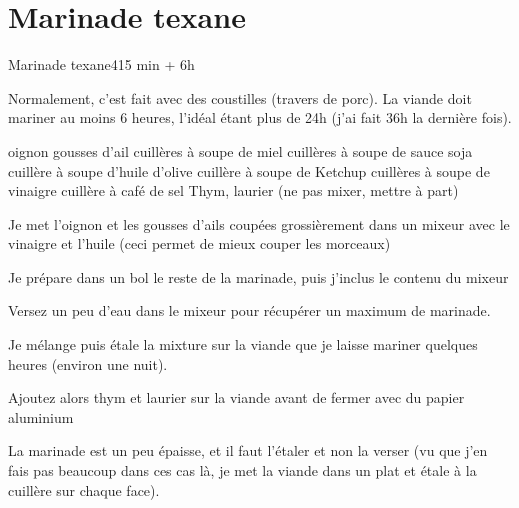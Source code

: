 {\section{Marinade texane}\label{sec:travers_texane}
\begin{recette}{Marinade texane}{4}{15 min + 6h}{}
\begin{remarque}
Normalement, c'est fait avec des coustilles (travers de porc). La viande doit mariner au moins 6 heures, l'idéal étant plus de 24h (j'ai fait 36h la dernière fois).
\end{remarque}
\begin{ingredients}
 oignon
 gousses d'ail
 cuillères à soupe de miel
 cuillères à soupe de sauce soja
 cuillère à soupe d'huile d'olive
 cuillère à soupe de Ketchup
 cuillères à soupe de vinaigre
 cuillère à café de sel
\ingredient Thym, laurier (ne pas mixer, mettre à part)
\end{ingredients}

\begin{preparation}
\item Je met l'oignon et les gousses d'ails coupées grossièrement dans un mixeur avec le vinaigre et l'huile (ceci permet de 
mieux couper les morceaux)
\item Je prépare dans un bol le reste de la marinade, puis j'inclus le contenu du mixeur
\item Versez un peu d'eau dans le mixeur pour récupérer un maximum de marinade.
\item Je mélange puis étale la mixture sur la viande que je laisse mariner quelques heures (environ une nuit).
\item Ajoutez alors thym et laurier sur la viande avant de fermer avec du papier aluminium
\end{preparation}

\begin{remarque}
La marinade est un peu épaisse, et il faut l'étaler et non la verser (vu que j'en fais pas beaucoup dans ces cas là, je met la 
viande dans un plat et étale à la cuillère sur chaque face).
\end{remarque}
\end{recette}


}%
